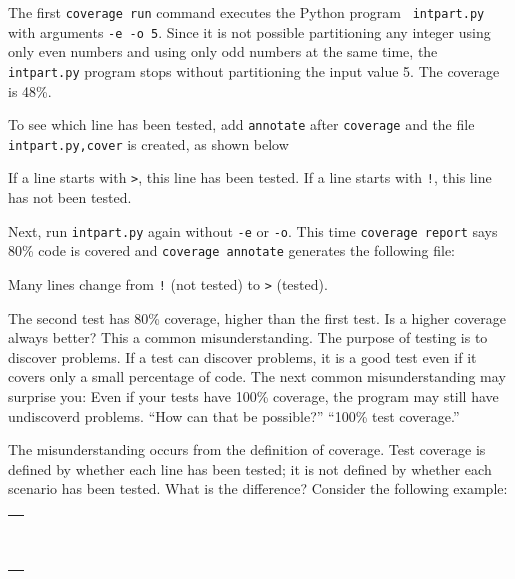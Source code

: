 {The first {\tt coverage run} command executes the Python program {\tt
  intpart.py} with arguments {\tt -e -o 5}.  Since it is not possible
partitioning any integer using only even numbers and using only odd
numbers at the same time, the {\tt intpart.py} program stops without
partitioning the input value 5. The coverage is 48\%.

To see which line has been tested, add {\tt annotate}
after {\tt coverage} and the file {\tt intpart.py,cover}
is created, as shown below

\resetlinenumber[1]
\linenumbers
\begin{tt}
  
\end{tt}
\nolinenumbers

If a line starts with {\tt >}, this line has been tested.
If a line starts with {\tt !}, this line has not been tested.

Next, run {\tt intpart.py} again without {\tt -e} or
{\tt -o}.  This time {\tt coverage report}
says 80\% code is covered and {\tt coverage annotate}
generates the following file:

\resetlinenumber[1]
\linenumbers
\begin{tt}
  
\end{tt}
\nolinenumbers

Many lines change from {\tt !} (not tested) to {\tt >} (tested).

The second test has 80\% coverage, higher than the first test. Is a
higher coverage always better? This a common misunderstanding.  The
purpose of testing is to discover problems.  If a test can discover
problems, it is a good test even if it covers only a small percentage
of code.  The next common misunderstanding may surprise you: Even if
your tests have 100\% coverage, the program may still have undiscoverd
problems.  ``How can that be possible?'' ``100\% test coverage.''

The misunderstanding occurs from the definition of coverage.  Test
coverage is defined by whether each line has been tested; it is not
defined by whether each scenario has been tested. What is the
difference? Consider the following example:

\vspace{0.2in}

\noindent
\begin{tabular}{|p{5in}|}\hline
\begin{verbatim}


\end{verbatim}
\end{tabular}}
